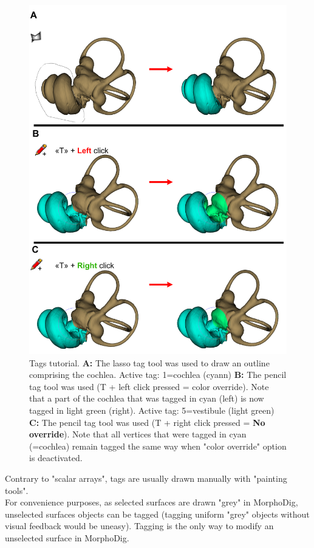 \documentclass[12pt, a4paper]{book}
\begin{document}
\begin{figure}
  \centering
  \includegraphics[scale=0.2]{tag_tutorial.png}
\caption{Tags tutorial. \textbf{A:} The lasso tag tool was used to draw an outline comprising the cochlea. Active tag: 1=cochlea (cyann)  \textbf{B:} The pencil tag tool was used (T + left click pressed = color override). Note that a part of the cochlea that was tagged in cyan (left) is now tagged in light green (right).  Active tag: 5=vestibule (light green) \textbf{C:} The pencil tag tool was used (T + right click pressed = \textbf{No override}). Note that all vertices that were tagged in cyan (=cochlea) remain tagged the same way when "color override" option is deactivated.}	
\label{tag_tutorial}
 \end{figure}


Contrary to "scalar arrays", tags are usually drawn manually with "painting tools". \\
For convenience purposes, as selected surfaces are drawn "grey" in MorphoDig, unselected surfaces objects can be tagged (tagging uniform "grey" objects without visual feedback would be uneasy). Tagging is the only way to modify an unselected surface in MorphoDig. \\
\end{document}

